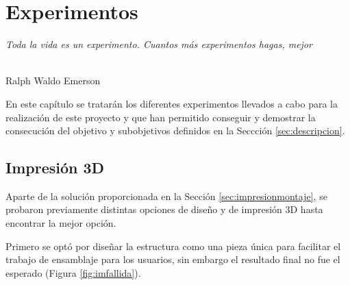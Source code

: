 \chapter{Experimentos}
\label{cap:capitulo7}

\begin{flushright}
\begin{minipage}[]{10cm}
\emph{Toda la vida es un experimento. Cuantos más experimentos hagas, mejor}\\
\end{minipage}\\

Ralph Waldo Emerson\\
\end{flushright}

\vspace{1cm}

\setcounter{footnote}{132} %

En este capítulo se tratarán los diferentes experimentos llevados a cabo para la realización de este proyecto y que han permitido conseguir y demostrar la consecución del objetivo y subobjetivos definidos en la Seccción \ref{sec:descripcion}.

\section{Impresión 3D}
\label{sec:expimpresion3d}
Aparte de la solución proporcionada en la Sección \ref{sec:impresionmontaje}, se probaron previamente distintas opciones de diseño y de impresión 3D hasta encontrar la mejor opción.

Primero se optó por diseñar la estructura como una pieza única para facilitar el trabajo de ensamblaje para los usuarios, sin embargo el resultado final no fue el esperado (Figura \ref{fig:imfallida}). 


